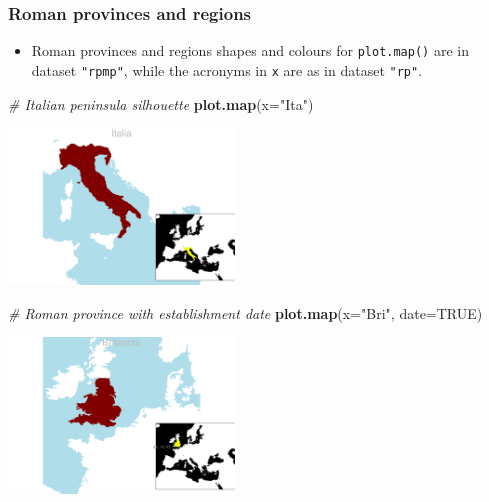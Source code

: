 \documentclass[a4paper,11pt]{memoir}
\newenvironment{Shaded}{\begin{snugshade}}{\end{snugshade}}
\newcommand{\CommentTok}[1]{\textcolor[rgb]{0.56,0.35,0.01}{\textit{#1}}}
\newcommand{\DataTypeTok}[1]{\textcolor[rgb]{0.13,0.29,0.53}{#1}}
\newcommand{\KeywordTok}[1]{\textcolor[rgb]{0.13,0.29,0.53}{\textbf{#1}}}
\newcommand{\NormalTok}[1]{#1}
\newcommand{\OtherTok}[1]{\textcolor[rgb]{0.56,0.35,0.01}{#1}}
\newcommand{\StringTok}[1]{\textcolor[rgb]{0.31,0.60,0.02}{#1}}
\providecommand{\tightlist}{%
  \setlength{\itemsep}{0pt}\setlength{\parskip}{0pt}}
\begin{document}
\bigbreak
\bigbreak

\hypertarget{roman-provinces-and-regions}{%
\subsubsection{Roman provinces and
regions}\label{roman-provinces-and-regions}}

\begin{itemize}
\tightlist
\item
  Roman provinces and regions shapes and colours for \texttt{plot.map()}
  are in dataset \texttt{"rpmp"}, while the acronyms in \texttt{x} are
  as in dataset \texttt{"rp"}.
\end{itemize}

\begin{Shaded}
\begin{Highlighting}[]
\CommentTok{# Italian peninsula silhouette}
\KeywordTok{plot.map}\NormalTok{(}\DataTypeTok{x=}\StringTok{"Ita"}\NormalTok{)}
\end{Highlighting}
\end{Shaded}

{\centering
\includegraphics[width=6cm, trim=0 0 0 0, clip]{img/unnamed-chunk-5-1_} %
}

\bigbreak
\bigbreak

\begin{Shaded}
\begin{Highlighting}[]
\CommentTok{# Roman province with establishment date}
\KeywordTok{plot.map}\NormalTok{(}\DataTypeTok{x=}\StringTok{"Bri"}\NormalTok{, }\DataTypeTok{date=}\OtherTok{TRUE}\NormalTok{)}
\end{Highlighting}
\end{Shaded}

{\centering
\includegraphics[width=6cm, trim=0 0 0 0, clip]{img/unnamed-chunk-6-1} %
}
\end{document}
